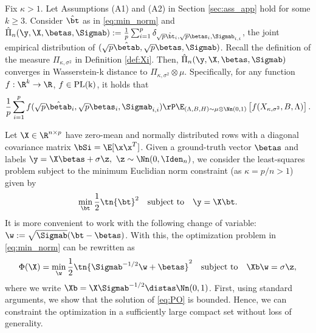 \begin{theorem}\label{thm:master_W2} %
Fix $\kappa>1$. Let Assumptions (A1) and (A2) in Section \ref{sec:ass_app} hold for some $k\geq 3$. Consider $\hat{\bt}$ as in \eqref{eq:min_norm} and $\hat\Pi_n(\y,\X,\betas,\Sigmab):=\frac{1}{p}\sum_{i=1}^{p}\delta_{\sqrt{p}\hat{\bt}_i,\sqrt{p}\betas_i,\Sigmab_{i,i}}$, the joint empirical distribution of $(\sqrt{p}\hat\betab,\sqrt{p}\betas,\Sigmab)$. Recall the definition of the measure $\Pi_{\kappa,\sigma^2}$ in Definition \ref{def:Xi}. Then, $\hat\Pi_n(\y,\X,\betas,\Sigmab)$ converges in Wasserstein-k distance to $\Pi_{\kappa,\sigma^2}\otimes\mu$.
%
Specifically, for any function $f:\R^k\rightarrow\R$, $f\in\rm{PL}(k)$, it holds that
\begin{align}\label{eq:thm}
\frac{1}{p} \sum_{i=1}^{p} f(\sqrt{p}\hat\betab_i,\sqrt{p}\betas_i,\Sigmab_{i,i}) \rP \E_{(\Lambda,B,H)\sim\mu\otimes\Nn(0,1)}\left[f(X_{\kappa,\sigma^2},B,\Lambda) \right].
\end{align}
\end{theorem}



\vspace{5pt}
Let $\X\in\R^{n\times p}$ have zero-mean and normally distributed rows with a diagonal covariance matrix $\bSi=\E[\x\x^T]$. Given a ground-truth vector $\betas$ and labels $\y=\X\betas+\sigma \z,~\z\sim\Nn(0,\Iden_n)$, we consider the least-squares problem subject to the minimum Euclidian norm constraint (as $\kappa=p/n>1$) given by
\begin{align}\label{eq:PO_beta}
\min_{\bt}\frac{1}{2}\tn{\bt}^2\quad\text{subject to}\quad \y=\X\bt.
\end{align}
It is more convenient to work with the following change of variable: $\w:=\sqrt{\Sigmab}(\bt-\betas)$. With this, the optimization problem  in \eqref{eq:min_norm} can be rewritten as
\begin{align}\label{eq:PO}
\Phi(\X)=\min_{\w} \frac{1}{2}\tn{\Sigmab^{-1/2}\w+\betas}^2\quad\text{subject to}\quad \Xb\w=\sigma \z,
\end{align}
where we write $\Xb=\X\Sigmab^{-1/2}\distas\Nn(0,1)$. First, using standard arguments, we show that the solution of \eqref{eq:PO} is bounded. Hence, we can constraint the optimization in a sufficiently large compact set without loss of generality.


